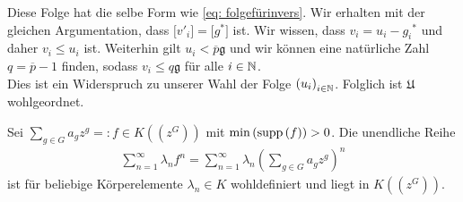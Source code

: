 {Diese Folge hat die selbe Form wie \ref{eq: folgefürinvers}. Wir erhalten mit der gleichen Argumentation, dass $\lbrack {v'}_i\rbrack = \lbrack g^*\rbrack$ ist.
%
%
%
%
%
Wir wissen, dass $v_i = u_i - {g_i}^*$ und daher ${v}_i \le u_i$ ist. Weiterhin gilt $u_i < \overline{p}\mathfrak{g}$ und wir können eine natürliche Zahl $q = \overline{p}-1$ finden, sodass $v_i \le q\mathfrak{g}$ für alle $i \in \mathbb{N}$.\\
Dies ist ein Widerspruch zu unserer Wahl der Folge ${\left(u_i\right)}_{i\in\mathbb{N}}$. Folglich ist $\mathfrak{U}$ wohlgeordnet.
%
%
%
%
%

%
%
%
%

}
\begin{lemma}\label{unendlicheSummeinPotenzreihenring}
%
%
Sei $\sum_{g \in G}^{}a_g z^g =: f \in K\left(\left(z^{G}\right)\right)$ mit $\min\left(\textup{supp}\left(f\right)\right) > 0$. Die unendliche Reihe
%
%
\begin{eqnarray*}
\sum_{n=1}^{\infty}\lambda_nf^n
= \sum_{n=1}^{\infty}\lambda_n{\left(\sum_{g \in G}^{}a_g z^g\right)}^n
\end{eqnarray*}
%
%
ist für beliebige Körperelemente $\lambda_n \in K$ wohldefiniert und liegt in $K\left(\left(z^{G}\right)\right)$.
\end{lemma}
% 
% 
%
%
%
% 
%
